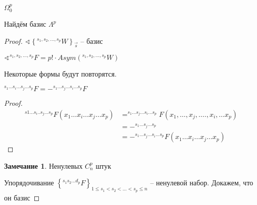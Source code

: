 \documentclass{book}
\theoremstyle{definition}
\newtheorem*{note}{Замечание}
\begin{document}
 \begin{problem}
        $\Omega_0^p$

     Найдём базис $\Lambda ^p$
 \end{problem}
 \begin{proof}
     $\sphericalangle \left\{ ^{s_1, s_2, \ldots, s_p} W \right\} _{\vec s}$ -- базис

     $\sphericalangle ^{s_1, s_2, \ldots, s_p}F = p!\cdot Asym \left( ^{s_1, s_2, \ldots, s_p}W \right) $

     \begin{lemma}
         Некоторые формы будут повторятся.

         $^{s_1 \ldots s_i \ldots s_j \ldots s_p}F = - ^{s_1 \ldots s_j \ldots s_i \ldots s_p} F$
     \end{lemma}

     \begin{proof}
        \begin{align*}
            ^{s1 ... s_i .. s_j \ldots s_p}F\left( x_1 \ldots x_i \ldots x_j \ldots x_p \right)  &= ^{s_1 \ldots s_j \ldots s_i \ldots s_p}F\left( x_1, \ldots, x_j, \ldots., x_i, \ldots x_p \right)\\
            &  = - ^{s_1 \ldots s_j \ldots s_p}\\
            &= - ^{s_1 \ldots s_j \ldots s_i \ldots s_p}F\left( x_1 \ldots x_i \ldots x_j \ldots x_p \right) 
        \end{align*}     
     \end{proof}

     \begin{note}
         Ненулевых $C_n^p$ штук
     \end{note}
     
     Упорядочивание $\left\{ ^{s_1 s_2 \ldots d_p} F\right\}_{1 \leqslant s_1 < s_2 < \ldots < s_p \leqslant n} $  -- ненулевой набор. Докажем, что он базис


 \end{proof}
\end{document}
